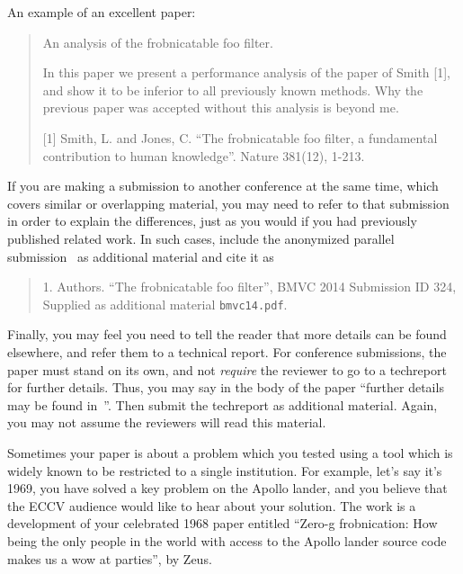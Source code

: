 \documentclass[runningheads]{llncs}
\begin{document}
An example of an excellent paper:

\begin{quote}
\begin{center}
     An analysis of the frobnicatable foo filter.
\end{center}

   In this paper we present a performance analysis of the
   paper of Smith [1], and show it to be inferior to
   all previously known methods.  Why the previous paper
   was accepted without this analysis is beyond me.

   [1] Smith, L. and Jones, C. ``The frobnicatable foo
   filter, a fundamental contribution to human knowledge''.
   Nature 381(12), 1-213.
\end{quote}

If you are making a submission to another conference at the same
time, which covers similar or overlapping material, you may need
to refer to that submission in order to explain the differences,
just as you would if you had previously published related work. In
such cases, include the anonymized parallel
submission~\cite{Authors14} as additional material and cite it as
\begin{quote}
1. Authors. ``The frobnicatable foo filter'', BMVC 2014 Submission
ID 324, Supplied as additional material {\tt bmvc14.pdf}.
\end{quote}

Finally, you may feel you need to tell the reader that more
details can be found elsewhere, and refer them to a technical
report.  For conference submissions, the paper must stand on its
own, and not {\em require} the reviewer to go to a techreport for
further details.  Thus, you may say in the body of the paper
``further details may be found in~\cite{Authors14b}''.  Then
submit the techreport as additional material. Again, you may not
assume the reviewers will read this material.

Sometimes your paper is about a problem which you tested using a tool which
is widely known to be restricted to a single institution.  For example,
let's say it's 1969, you have solved a key problem on the Apollo lander,
and you believe that the ECCV audience would like to hear about your
solution.  The work is a development of your celebrated 1968 paper entitled
``Zero-g frobnication: How being the only people in the world with access to
the Apollo lander source code makes us a wow at parties'', by Zeus.
\end{document}
